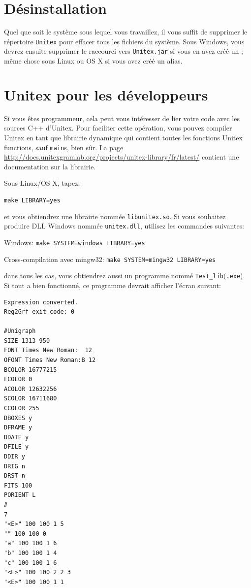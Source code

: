 \section{Désinstallation}
Quel que soit le système sous lequel vous travaillez, il vous suffit de supprimer le répertoire
\verb+Unitex+ pour effacer tous les fichiers du système. Sous Windows, vous devrez ensuite supprimer
le raccourci vers \verb+Unitex.jar+  si vous en avez créé un ;
même chose sous Linux ou OS X si vous avez créé un alias.


\section{Unitex pour les développeurs}
\label{section-unitex-developpers}
Si vous êtes programmeur, cela peut vous intéresser de lier votre code avec les sources C++
d'Unitex. Pour faciliter cette opération, vous pouvez compiler Unitex en tant que librairie
dynamique qui contient toutes les fonctions Unitex functions, sauf \verb+main+s, bien sûr. La
page \url{http://docs.unitexgramlab.org/projects/unitex-library/fr/latest/} contient une documentation sur la librairie.


\bigskip
Sous Linux/OS X, tapez:

\bigskip
\verb+make LIBRARY=yes+

\bigskip
\noindent et vous obtiendrez une librairie nommée \verb+libunitex.so+. Si vous souhaitez produire 
DLL Windows nommée \verb+unitex.dll+, utilisez les commandes suivantes:

\bigskip
Windows: \verb+make SYSTEM=windows LIBRARY=yes+

Cross-compilation avec mingw32: \verb+make SYSTEM=mingw32 LIBRARY=yes+

\bigskip
\noindent dans tous les cas, vous obtiendrez aussi un programme nommé
\verb+Test_lib+(\verb+.exe+). Si tout a bien fonctionné, ce programme devrait afficher l'écran
suivant:

\begin{verbatim}
Expression converted.
Reg2Grf exit code: 0

#Unigraph
SIZE 1313 950
FONT Times New Roman:  12
OFONT Times New Roman:B 12
BCOLOR 16777215
FCOLOR 0
ACOLOR 12632256
SCOLOR 16711680
CCOLOR 255
DBOXES y
DFRAME y
DDATE y
DFILE y
DDIR y
DRIG n
DRST n
FITS 100
PORIENT L
#
7
"<E>" 100 100 1 5
"" 100 100 0
"a" 100 100 1 6
"b" 100 100 1 4
"c" 100 100 1 6
"<E>" 100 100 2 2 3
"<E>" 100 100 1 1
\end{verbatim}
